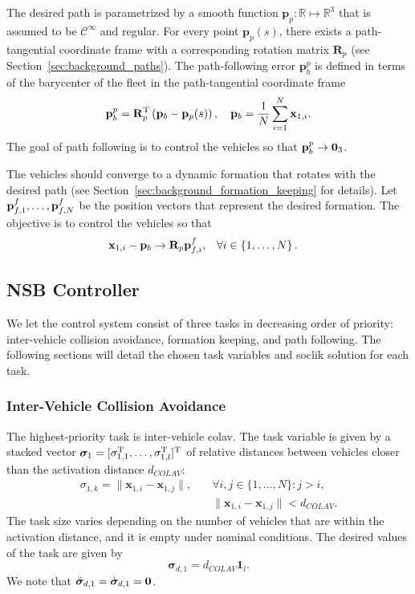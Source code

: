 The desired path is parametrized by a smooth function $\mathbf{p}_p : \mathbb{R} \mapsto \mathbb{R}^3$ that is assumed to be $\mathcal{C}^\infty$ and regular.
For every point $\mathbf{p}_p(s)$, there exists a path-tangential coordinate frame with a corresponding rotation matrix $\mathbf{R}_p$ (see Section~\ref{sec:background_paths}). 
The path-following error $\mathbf{p}_b^p$ is defined in terms of the barycenter of the fleet in the path-tangential coordinate frame
\begin{equation}
    \mathbf{p}_b^p = \mathbf{R}_p^{\mathrm{T}}\left(\mathbf{p}_b - \mathbf{p}_p(s)\right), \quad \mathbf{p}_b = \frac{1}{N}\sum_{i=1}^N \mathbf{x}_{1,i}.
\end{equation}
The goal of path following is to control the vehicles so that $\mathbf{p}_b^p \rightarrow \mathbf{0}_3$.

The vehicles should converge to a dynamic formation that rotates with the desired path (see Section~\ref{sec:background_formation_keeping} for details).
Let $\mathbf{p}_{f,1}^f, \ldots, \mathbf{p}_{f,N}^f$ be the position vectors that represent the desired formation.
The objective is to control the vehicles so that
\begin{align}
    \mathbf{x}_{1,i} - \mathbf{p}_b &\rightarrow \mathbf{R}_p \mathbf{p}_{f,i}^f, &
    \forall i &\in \left\{1, \ldots, N \right\}.
\end{align}

\subsection{NSB Controller}\label{sec:NSB_case_study}

We let the control system consist of three tasks in decreasing order of priority: inter-vehicle collision avoidance, formation keeping, and path following. The following sections will detail the chosen task variables and \gls{soclik} solution for each task.

\subsubsection{Inter-Vehicle Collision Avoidance}

The highest-priority task is inter-vehicle \acrfull{colav}. The task variable is given by a stacked vector $\bm{\sigma}_1 = [\sigma_{1,1}^{\mathrm{T}}, \ldots, \sigma_{1,l}^{\mathrm{T}}]^{\mathrm{T}}$ of relative distances between vehicles closer than the activation distance $d_{COLAV}$:
\begin{equation}
\begin{split}
    \sigma_{1,k} = \|\mathbf{x}_{1,i} - \mathbf{x}_{1,j}\|, \quad &\forall i,j \in \{1, \ldots, N\}: j > i,\\
    &\|\mathbf{x}_{1,i} - \mathbf{x}_{1,j}\| < d_{COLAV}.
    \end{split}
\end{equation}
The task size varies depending on the number of vehicles that are within the activation distance, and it is empty under nominal conditions. The desired values of the task are given by
\begin{equation}
    \bm{\sigma}_{d,1} = d_{COLAV} \mathbf{1}_l.
\end{equation}
We note that $\ddot{\bm{\sigma}}_{d,1} = \dot{\bm{\sigma}}_{d,1}= \mathbf{0}$.

